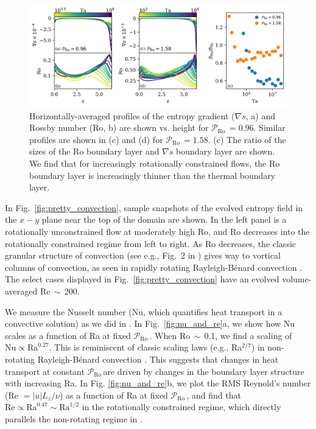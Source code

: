 \documentclass[twocolumn, amsmath, amsfonts, amssymb]{aastex62}
\newcommand{\grad}{\ensuremath{\nabla}}
\newcommand{\RB}{Rayleigh-B\'{e}nard }
\newcommand{\pro}{\ensuremath{\mathcal{P}_{\text{Ro}}\,}}
\begin{document}
\begin{figure}[ht!]
\includegraphics[width=\textwidth]{./figs/boundary_layers.png}
\caption{Horizontally-averaged profiles of the entropy gradient ($\grad s$, a)
and Rossby number (Ro, b) are shown vs. height for $\pro = 0.96$. 
Similar profiles are shown in (c) and (d) for $\pro = 1.58$. 
(c) The ratio of the sizes of the Ro boundary layer and $\grad s$ boundary layer are
shown. We find that for increasingly rotationally constrained flows, the Ro boundary layer
is increasingly thinner than the thermal boundary layer.
\label{fig:profiles_and_bls} }
\end{figure}


In Fig.~\ref{fig:pretty_convection}, sample snapshots
of the evolved entropy field in the $x-y$ plane near the top of the domain are shown. 
In the left panel is a rotationally unconstrained flow at moderately high
Ro, and Ro decreases into the rotationally constrained regime from left to right.
As Ro decreases, the
classic granular structure of convection (see e.g., Fig.~2 in \AB) gives way to vortical
columns of convection, as seen in rapidly rotating \RB convection \citep{stellmach&all2014}.
The select cases displayed in Fig.~\ref{fig:pretty_convection} have an evolved volume-averaged
Re$\,\sim\,$200.


We measure the Nusselt number (Nu, which quantifies heat transport in a convective
solution) as we did in \AB.
In Fig.~\ref{fig:nu_and_re}a, we show how Nu scales as a function
of Ra at fixed \pro. When Ro$\,\sim\,$0.1,
we find a scaling of $\text{Nu} \propto \text{Ra}^{0.27}$. This is reminiscent of
classic scaling laws (e.g., Ra$^{2/7}$) in non-rotating \RB convection \citep{ahlers&all2009}.
This suggests that changes in heat transport at constant \pro are driven by
changes in the boundary layer structure with increasing Ra.
In Fig. \ref{fig:nu_and_re}b, we plot the RMS Reynold's
number (Re $= |u| L_z / \nu$) as a function of Ra at fixed \pro, and find that 
$\text{Re} \propto \text{Ra}^{0.47} \sim \text{Ra}^{1/2}$ in the rotationally constrained regime,
which directly parallels the non-rotating regime in \AB.
\end{document}
